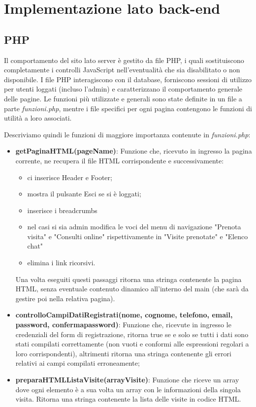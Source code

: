 \section{Implementazione lato back-end}

\subsection{PHP}
Il comportamento del sito lato server è gestito da file PHP, i quali sostituiscono completamente i controlli JavaScript nell'eventualità che sia disabilitato o non disponibile. I file PHP interagiscono con il database, forniscono sessioni di utilizzo per utenti loggati (incluso l'admin) e caratterizzano il comportamento generale delle pagine. Le funzioni più utilizzate e generali sono state definite in un file a parte \textit{funzioni.php}, mentre i file specifici per ogni pagina contengono le funzioni di utilità a loro associati. 

Descriviamo quindi le funzioni di maggiore importanza contenute in \textit{funzioni.php}:
\begin{itemize}
\item \textbf{getPaginaHTML(pageName)}: Funzione che, ricevuto in ingresso la pagina corrente, ne recupera il file HTML corrispondente e successivamente:
\begin{itemize}
\item ci inserisce Header e Footer;
\item mostra il pulsante Esci se si è loggati;
\item inserisce i breadcrumbs
\item nel casi si sia admin modifica le voci del menu di navigazione "Prenota visita" e "Consulti online" rispettivamente in "Visite prenotate" e "Elenco chat"
\item elimina i link ricorsivi.
\end{itemize}
Una volta eseguiti questi passaggi ritorna una stringa contenente la pagina HTML, senza eventuale contenuto dinamico all'interno del main (che sarà da gestire poi nella relativa pagina).
\item \textbf{controlloCampiDatiRegistrati(nome, cognome, telefono, email, password, confermapassword)}: Funzione che, ricevute in ingresso le credenziali del form di registrazione, ritorna true se e solo se tutti i dati sono stati compilati correttamente (non vuoti e conformi alle espressioni regolari a loro corrispondenti), altrimenti ritorna una stringa contenente gli errori relativi ai campi compilati erroneamente;
\item \textbf{preparaHTMLListaVisite(arrayVisite)}: Funzione che riceve un array dove ogni elemento è a sua volta un array con le informazioni della singola visita. Ritorna una stringa contenente la lista delle visite in codice HTML.\\
\end{itemize}

